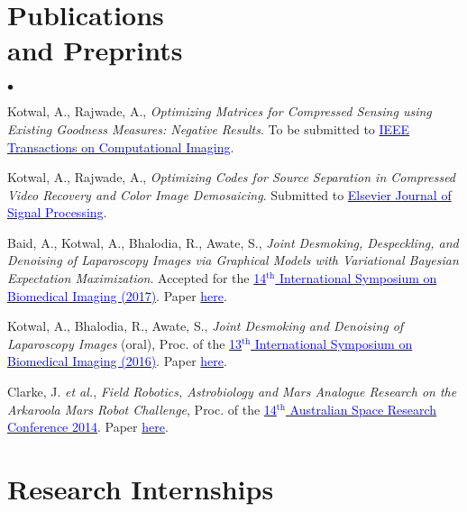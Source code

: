 \documentclass[margin,line]{res}
\newenvironment{list2}{
  \begin{list}{$\bullet$}{%
      \setlength{\itemsep}{0in}
      \setlength{\parsep}{0in} \setlength{\parskip}{0in}
      \setlength{\topsep}{0in} \setlength{\partopsep}{0in} 
      \setlength{\leftmargin}{0.2in}}}{\end{list}}
\begin{document}
\begin{resume}
\section{\sc Publications \\ and Preprints}
\begin{list2}
\item Kotwal, A., Rajwade, A., {\em Optimizing Matrices for Compressed Sensing using Existing Goodness Measures: Negative Results}. To be submitted to \href{http://ieeexplore.ieee.org/xpl/RecentIssue.jsp?reload=true&punumber=6745852}{\textcolor{blue} {IEEE Transactions on Computational Imaging}}.
\item Kotwal, A., Rajwade, A., {\em Optimizing Codes for Source Separation in Compressed Video Recovery and Color Image Demosaicing}. Submitted to \href{http://www.sciencedirect.com/science/journal/01651684}{\textcolor{blue} {Elsevier Journal of Signal Processing}}.
\item Baid, A., Kotwal, A., Bhalodia, R., Awate, S., {\em Joint Desmoking, Despeckling, and Denoising of Laparoscopy Images via Graphical Models with Variational Bayesian Expectation Maximization}. Accepted for the \href{http://biomedicalimaging.org/2017/}{\textcolor{blue} {14$^\text{th}$ International Symposium on Biomedical Imaging (2017)}}. Paper \href{http://alankarkotwal.github.io/pubs/isbi17.pdf}{\textcolor{blue} {here}}.
\item Kotwal, A., Bhalodia, R., Awate, S., {\em Joint Desmoking and Denoising of Laparoscopy Images} (oral), Proc. of the \href{http://biomedicalimaging.org/2016/}{\textcolor{blue} {13$^\text{th}$ International Symposium on Biomedical Imaging (2016)}}. Paper \href{http://alankarkotwal.github.io/pubs/isbi16.pdf}{\textcolor{blue} {here}}.
\item Clarke, J. {\em et al.}, {\em Field Robotics, Astrobiology and Mars Analogue Research on the Arkaroola Mars Robot Challenge}, Proc. of the \href{http://www.nssa.com.au/14asrc/14ASRC-proceedings.zip}{\textcolor{blue} {14$^\text{th}$ Australian Space Research Conference 2014}}. Paper \href{http://alankarkotwal.github.io/pubs/asrc14.pdf}{\textcolor{blue} {here}}.
\end{list2}

\section{\sc Research Internships} 


\end{resume}
\end{document}
